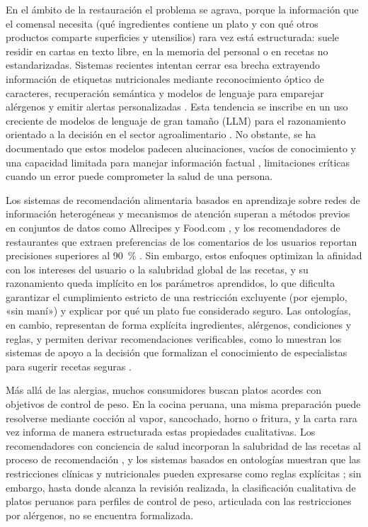 \documentclass[conference]{IEEEtran}
\begin{document}
En el ámbito de la restauración el problema se agrava, porque la información que el comensal necesita (qué ingredientes contiene un plato y con qué otros productos comparte superficies y utensilios) rara vez está estructurada: suele residir en cartas en texto libre, en la memoria del personal o en recetas no estandarizadas. Sistemas recientes intentan cerrar esa brecha extrayendo información de etiquetas nutricionales mediante reconocimiento óptico de caracteres, recuperación semántica y modelos de lenguaje para emparejar alérgenos y emitir alertas personalizadas \cite{prasad2026}. Esta tendencia se inscribe en un uso creciente de modelos de lenguaje de gran tamaño (LLM) para el razonamiento orientado a la decisión en el sector agroalimentario \cite{shafay2026}. No obstante, se ha documentado que estos modelos padecen alucinaciones, vacíos de conocimiento y una capacidad limitada para manejar información factual \cite{bagozi2026}, limitaciones críticas cuando un error puede comprometer la salud de una persona.

Los sistemas de recomendación alimentaria basados en aprendizaje sobre redes de información heterogéneas y mecanismos de atención superan a métodos previos en conjuntos de datos como Allrecipes y Food.com \cite{forouzandeh2024uifrs,forouzandeh2024health}, y los recomendadores de restaurantes que extraen preferencias de los comentarios de los usuarios reportan precisiones superiores al 90~\% \cite{asani2021}. Sin embargo, estos enfoques optimizan la afinidad con los intereses del usuario o la salubridad global de las recetas, y su razonamiento queda implícito en los parámetros aprendidos, lo que dificulta garantizar el cumplimiento estricto de una restricción excluyente (por ejemplo, «sin maní») y explicar por qué un plato fue considerado seguro. Las ontologías, en cambio, representan de forma explícita ingredientes, alérgenos, condiciones y reglas, y permiten derivar recomendaciones verificables, como lo muestran los sistemas de apoyo a la decisión que formalizan el conocimiento de especialistas para sugerir recetas seguras \cite{spoladore2024}.

Más allá de las alergias, muchos consumidores buscan platos acordes con objetivos de control de peso. En la cocina peruana, una misma preparación puede resolverse mediante cocción al vapor, sancochado, horno o fritura, y la carta rara vez informa de manera estructurada estas propiedades cualitativas. Los recomendadores con conciencia de salud incorporan la salubridad de las recetas al proceso de recomendación \cite{forouzandeh2024health}, y los sistemas basados en ontologías muestran que las restricciones clínicas y nutricionales pueden expresarse como reglas explícitas \cite{spoladore2024}; sin embargo, hasta donde alcanza la revisión realizada, la clasificación cualitativa de platos peruanos para perfiles de control de peso, articulada con las restricciones por alérgenos, no se encuentra formalizada.
\end{document}

